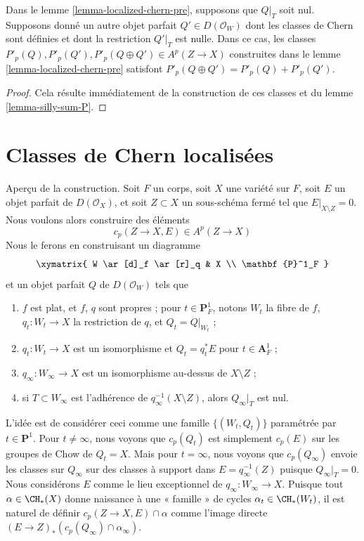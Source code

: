 \begin{lemma}
\label{lemma-localized-chern-pre-sum-P}
Dans le lemme \ref{lemma-localized-chern-pre}, supposons que $Q|_T$ soit nul.
Supposons donné un autre objet parfait $Q' \in D(\mathcal{O}_W)$
dont les classes de Chern sont définies et dont la restriction $Q'|_T$ est nulle.
Dans ce cas, les classes
$P'_p(Q), P'_p(Q'), P'_p(Q \oplus Q') \in A^p(Z \to X)$
construites dans le lemme \ref{lemma-localized-chern-pre}
satisfont $P'_p(Q \oplus Q') = P'_p(Q) + P'_p(Q')$.
\end{lemma}

\begin{proof}
Cela résulte immédiatement de la construction de ces
classes et du lemme \ref{lemma-silly-sum-P}.
\end{proof}









 
\section{Classes de Chern localisées}
\label{section-localized-chern}

\noindent
Aperçu de la construction. Soit $F$ un corps,
soit $X$ une variété sur $F$, soit $E$ un objet parfait de
$D(\mathcal{O}_X)$, et soit $Z \subset X$ un sous-schéma fermé
tel que $E|_{X \setminus Z} = 0$. Nous voulons alors construire des éléments
$$
c_p(Z \to X, E) \in A^p(Z \to X)
$$
Nous le ferons en construisant un diagramme
$$
\xymatrix{
W \ar[d]_f \ar[r]_q & X \\
\mathbf{P}^1_F
}
$$
et un objet parfait $Q$ de $D(\mathcal{O}_W)$ tels que
\begin{enumerate}
\item $f$ est plat, et $f$, $q$ sont propres ; pour $t \in \mathbf{P}^1_F$,
notons $W_t$ la fibre de $f$,
$q_t : W_t \to X$ la restriction de $q$, et $Q_t = Q|_{W_t}$ ;
\item $q_t : W_t \to X$ est un isomorphisme et $Q_t = q_t^*E$
pour $t \in \mathbf{A}^1_F$ ;
\item $q_\infty : W_\infty \to X$ est un isomorphisme au-dessus de $X \setminus Z$ ;
\item si $T \subset W_\infty$ est l'adhérence de
$q_\infty^{-1}(X \setminus Z)$, alors $Q_\infty|_T$ est nul.
\end{enumerate}
L'idée est de considérer ceci comme une famille $\{(W_t, Q_t)\}$
paramétrée par $t \in \mathbf{P}^1$.
Pour $t \not = \infty$, nous voyons que $c_p(Q_t)$ est simplement $c_p(E)$
sur les groupes de Chow de $Q_t = X$. Mais pour $t = \infty$, nous voyons que
$c_p(Q_\infty)$ envoie les classes sur $Q_\infty$ sur des classes à support dans
$E = q_\infty^{-1}(Z)$ puisque $Q_\infty|_T = 0$.
Nous considérons $E$ comme le lieu exceptionnel de $q_\infty : W_\infty \to X$.
Puisque tout $\alpha \in \CH_*(X)$ donne naissance à une « famille »
de cycles $\alpha_t \in \CH_*(W_t)$, il est naturel de définir
$c_p(Z \to X, E) \cap \alpha$ comme
l'image directe $(E \to Z)_*(c_p(Q_\infty) \cap \alpha_\infty)$.

